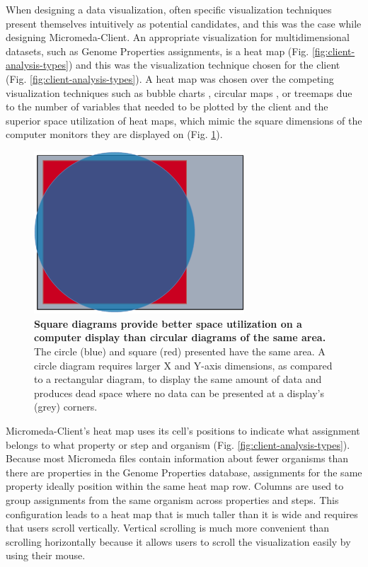 When designing a data visualization, often specific visualization techniques 
present themselves intuitively as potential candidates, and this was the case 
while designing Micromeda-Client. An appropriate visualization for 
multidimensional datasets, such as Genome Properties assignments, is a heat map 
\cite{wilkinson2009history,tufte2001visual}(Fig. 
\ref{fig:client-analysis-types}) and this was the visualization technique chosen 
for the client (Fig. \ref{fig:client-analysis-types}). A heat map was chosen 
over the competing visualization techniques such as bubble charts 
\cite{tufte2001visual}, circular maps 
\cite{ward2002taxonomy,stothard2004circular}, or treemaps 
\cite{shneiderman1998tree} due to the number of variables that needed to be 
plotted by the client and the superior space utilization of heat maps, which 
mimic the square dimensions of the computer monitors they are displayed on (Fig. 
\ref{fig:circle-square}).

\begin{figure}[!ht]
  \centering
	\includegraphics[width=0.7\textwidth]{media/square_vs_circle.pdf}
	 \caption[Square diagrams provide better space utilization on a computer 
display than circular diagrams of the same area.]{\textbf{Square diagrams 
provide better space utilization on a computer display than circular diagrams of 
the same area.} The circle (blue) and square (red) presented have the same area. 
A circle diagram requires larger X and Y-axis dimensions, as compared to a 
rectangular diagram, to display the same amount of data and produces dead space 
where no data can be presented at a display's (grey) corners.}
	 \label{fig:circle-square}
\end{figure}

Micromeda-Client's heat map uses its cell's positions to indicate what 
assignment belongs to what property or step and organism (Fig. 
\ref{fig:client-analysis-types}). Because most Micromeda files contain 
information about fewer organisms than there are properties in the Genome 
Properties database, assignments for the same property ideally position within 
the same heat map row. Columns are used to group assignments from the same 
organism across properties and steps. This configuration leads to a heat map 
that is much taller than it is wide and requires that users scroll vertically. 
Vertical scrolling is much more convenient than scrolling horizontally because 
it allows users to scroll the visualization easily by using their mouse.

